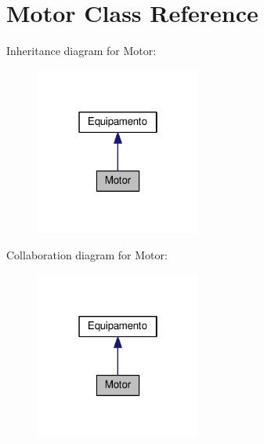 \hypertarget{class_motor}{}\section{Motor Class Reference}
\label{class_motor}


Inheritance diagram for Motor\+:
\nopagebreak
\begin{figure}[H]
\begin{center}
\leavevmode
\includegraphics[width=154pt]{class_motor__inherit__graph}
\end{center}
\end{figure}


Collaboration diagram for Motor\+:
\nopagebreak
\begin{figure}[H]
\begin{center}
\leavevmode
\includegraphics[width=154pt]{class_motor__coll__graph}
\end{center}
\end{figure}
